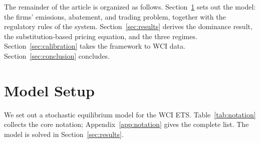 \documentclass[11pt,letterpaper]{article}
\theoremstyle{plain}
\theoremstyle{definition}
\numberwithin{equation}{section}
\begin{document}
The remainder of the article is organized as follows. Section~\ref{sec:model} sets out the model: the firms' emissions, abatement, and trading problem, together with the regulatory rules of the system. Section~\ref{sec:results} derives the dominance result, the substitution-based pricing equation, and the three regimes. Section~\ref{sec:calibration} takes the framework to WCI data. Section~\ref{sec:conclusion} concludes.

\section{Model Setup}\label{sec:model}

We set out a stochastic equilibrium model for the WCI ETS. Table~\ref{tab:notation} collects the core notation; Appendix~\ref{app:notation} gives the complete list. The model is solved in Section~\ref{sec:results}.
\end{document}
